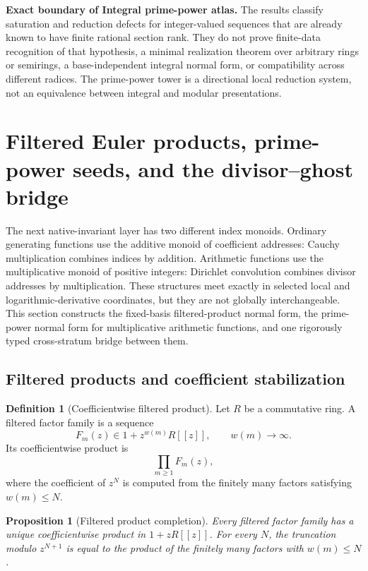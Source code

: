 \documentclass[11pt]{article}
\newtheorem{proposition}[theorem]{Proposition}
\theoremstyle{definition}
\newtheorem{definition}[theorem]{Definition}
\theoremstyle{remark}
\begin{document}


\begin{boundarybox}
\textbf{Exact boundary of Integral prime-power atlas.}
The results classify saturation and reduction defects for integer-valued sequences that are already known to have finite rational section rank.  They do not prove finite-data recognition of that hypothesis, a minimal realization theorem over arbitrary rings or semirings, a base-independent integral normal form, or compatibility across different radices.  The prime-power tower is a directional local reduction system, not an equivalence between integral and modular presentations.
\end{boundarybox}


\section{Filtered Euler products, prime-power seeds, and the divisor--ghost bridge}
\label{sec:block07-product-multiplicative}

The next native-invariant layer has two different index monoids.  Ordinary generating functions use the additive monoid of coefficient addresses: Cauchy multiplication combines indices by addition.  Arithmetic functions use the multiplicative monoid of positive integers: Dirichlet convolution combines divisor addresses by multiplication.  These structures meet exactly in selected local and logarithmic-derivative coordinates, but they are not globally interchangeable.  This section constructs the fixed-basis filtered-product normal form, the prime-power normal form for multiplicative arithmetic functions, and one rigorously typed cross-stratum bridge between them.

\subsection{Filtered products and coefficient stabilization}

\begin{definition}[Coefficientwise filtered product]
Let $R$ be a commutative ring.  A filtered factor family is a sequence
\[
F_m(z)\in 1+z^{w(m)}R[[z]],
\qquad
w(m)\longrightarrow\infty.
\]
Its coefficientwise product is
\[
\prod_{m\geq1}F_m(z),
\]
where the coefficient of $z^N$ is computed from the finitely many factors satisfying $w(m)\leq N$.
\end{definition}

\begin{proposition}[Filtered product completion]
Every filtered factor family has a unique coefficientwise product in $1+zR[[z]]$.  For every $N$, the truncation modulo $z^{N+1}$ is equal to the product of the finitely many factors with $w(m)\leq N$.
\end{proposition}
\end{document}
